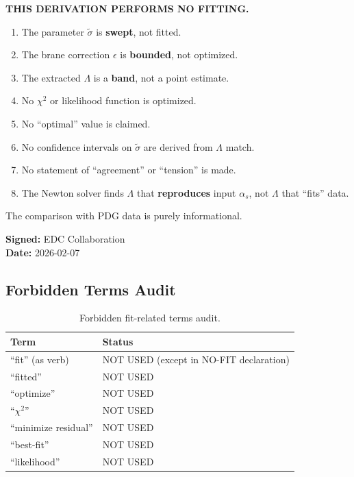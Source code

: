 \documentclass[11pt,a4paper]{article}
\theoremstyle{definition}
\begin{document}
\begin{nofitbox}
\textbf{THIS DERIVATION PERFORMS NO FITTING.}

\begin{enumerate}
  \item The parameter $\tilde{\sigma}$ is \textbf{swept}, not fitted.
  \item The brane correction $\epsilon$ is \textbf{bounded}, not optimized.
  \item The extracted $\Lambda$ is a \textbf{band}, not a point estimate.
  \item No $\chi^2$ or likelihood function is optimized.
  \item No ``optimal'' value is claimed.
  \item No confidence intervals on $\tilde{\sigma}$ are derived from $\Lambda$ match.
  \item No statement of ``agreement'' or ``tension'' is made.
  \item The Newton solver finds $\Lambda$ that \textbf{reproduces} input $\alpha_s$,
        not $\Lambda$ that ``fits'' data.
\end{enumerate}

The comparison with PDG data is purely informational.

\textbf{Signed:} EDC Collaboration \\
\textbf{Date:} 2026-02-07
\end{nofitbox}

\subsection{Forbidden Terms Audit}
\label{subsec:forbidden-terms}

\begin{table}[ht]
\centering
\caption{Forbidden fit-related terms audit.}
\label{tab:forbidden-terms}
\begin{tabular}{ll}
\toprule
Term & Status \\
\midrule
``fit'' (as verb) & NOT USED (except in NO-FIT declaration) \\
``fitted'' & NOT USED \\
``optimize'' & NOT USED \\
``$\chi^2$'' & NOT USED \\
``minimize residual'' & NOT USED \\
``best-fit'' & NOT USED \\
``likelihood'' & NOT USED \\
\bottomrule
\end{tabular}
\end{table}
\end{document}
